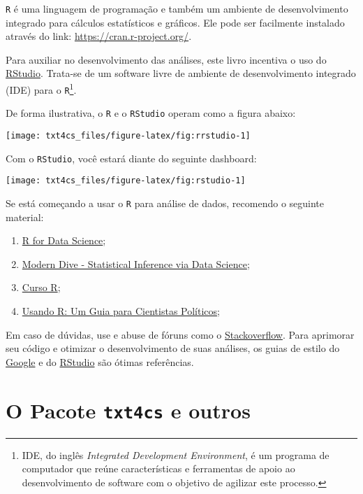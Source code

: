 \documentclass[]{book}
\let\rmarkdownfootnote\footnote%
\def\footnote{\protect\rmarkdownfootnote}
\begin{document}
\texttt{R} é uma linguagem de programação e também um ambiente de desenvolvimento integrado
para cálculos estatísticos e gráficos. Ele pode ser facilmente instalado através do link: \url{https://cran.r-project.org/}.

Para auxiliar no desenvolvimento das análises, este livro incentiva o uso do \href{https://www.rstudio.com/}{RStudio}. Trata-se de um software livre de ambiente de desenvolvimento integrado (IDE) para o \texttt{R}\footnote{IDE, do inglês \emph{Integrated Development Environment}, é um programa de computador que reúne características e ferramentas de apoio ao desenvolvimento de software com o objetivo de agilizar este processo.}.

De forma ilustrativa, o \texttt{R} e o \texttt{RStudio} operam como a figura abaixo:

\begin{center}\texttt{[image: txt4cs\_files/figure-latex/fig:rrstudio-1]} \end{center}

Com o \texttt{RStudio}, você estará diante do seguinte dashboard:

\begin{center}\texttt{[image: txt4cs\_files/figure-latex/fig:rstudio-1]} \end{center}

Se está começando a usar o \texttt{R} para análise de dados, recomendo o seguinte material:

\begin{enumerate}
\def\labelenumi{\arabic{enumi}.}
\item
  \href{https://r4ds.had.co.nz/}{R for Data Science};
\item
  \href{https://moderndive.com/index.html}{Modern Dive - Statistical Inference via Data Science};
\item
  \href{http://material.curso-r.com/rbase/}{Curso R};
\item
  \href{http://electionsbr.com/livro/}{Usando R: Um Guia para Cientistas Políticos};
\end{enumerate}

Em caso de dúvidas, use e abuse de fóruns como o \href{https://stackoverflow.com/}{Stackoverflow}. Para aprimorar seu código e otimizar o desenvolvimento de suas análises, os guias de estilo do \href{https://google.github.io/styleguide/Rguide.xml}{Google} e do \href{http://adv-r.had.co.nz/Style.html}{RStudio} são ótimas referências.

\hypertarget{o-pacote-txt4cs-e-outros}{%
\section{\texorpdfstring{O Pacote \texttt{txt4cs} e outros}{O Pacote txt4cs e outros}}\label{o-pacote-txt4cs-e-outros}}
\end{document}

